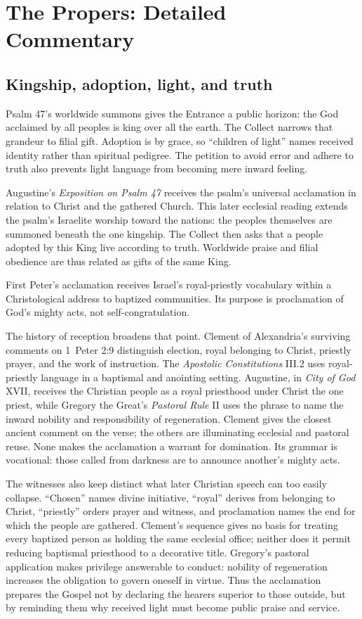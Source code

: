 \section*{The Propers: Detailed Commentary}

\subsection*{Kingship, adoption, light, and truth\enspace{}}

Psalm 47's worldwide summons gives the Entrance a public horizon: the God acclaimed by all peoples is king over all the earth. The Collect narrows that grandeur to filial gift. Adoption is by grace, so “children of light” names received identity rather than spiritual pedigree. The petition to avoid error and adhere to truth also prevents light language from becoming mere inward feeling.

Augustine's \emph{Exposition on Psalm 47} receives the psalm's universal acclamation in relation to Christ and the gathered Church. This later ecclesial reading extends the psalm's Israelite worship toward the nations: the peoples themselves are summoned beneath the one kingship. The Collect then asks that a people adopted by this King live according to truth. Worldwide praise and filial obedience are thus related as gifts of the same King.

First Peter's acclamation receives Israel's royal-priestly vocabulary within a Christological address to baptized communities. Its purpose is proclamation of God's mighty acts, not self-congratulation.

The history of reception broadens that point. Clement of Alexandria's surviving comments on 1~Peter 2:9 distinguish election, royal belonging to Christ, priestly prayer, and the work of instruction. The \emph{Apostolic Constitutions} III.2 uses royal-priestly language in a baptismal and anointing setting. Augustine, in \emph{City of God} XVII, receives the Christian people as a royal priesthood under Christ the one priest, while Gregory the Great's \emph{Pastoral Rule} II uses the phrase to name the inward nobility and responsibility of regeneration. Clement gives the closest ancient comment on the verse; the others are illuminating ecclesial and pastoral reuse. None makes the acclamation a warrant for domination. Its grammar is vocational: those called from darkness are to announce another's mighty acts.

The witnesses also keep distinct what later Christian speech can too easily collapse. “Chosen” names divine initiative, “royal” derives from belonging to Christ, “priestly” orders prayer and witness, and proclamation names the end for which the people are gathered. Clement's sequence gives no basis for treating every baptized person as holding the same ecclesial office; neither does it permit reducing baptismal priesthood to a decorative title. Gregory's pastoral application makes privilege answerable to conduct: nobility of regeneration increases the obligation to govern oneself in virtue. Thus the acclamation prepares the Gospel not by declaring the hearers superior to those outside, but by reminding them why received light must become public praise and service.

